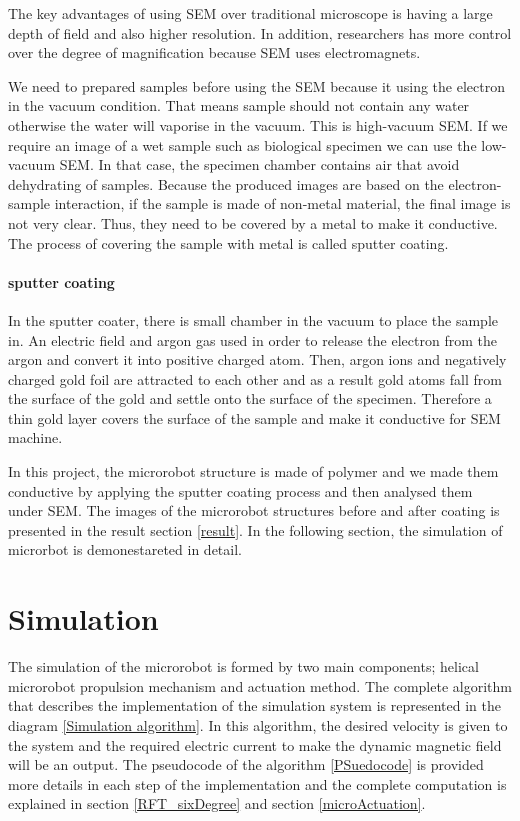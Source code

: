 \documentclass[12pt,a4paper,titlepage]{report}
\begin{document}
The key advantages of using \ac*{SEM} over traditional microscope is having a large depth of
 field and also higher resolution. In addition, researchers has more control over the degree of 
magnification because \ac*{SEM} uses electromagnets\citep{Doe:2014Jan:Online}.

We need to prepared samples before using the \ac{SEM} because it using the electron in the
 vacuum condition. That means sample should not contain any water otherwise the water will 
vaporise in the vacuum. This is high-vacuum \ac*{SEM}. If we require an image of a wet sample such 
as biological specimen we can use the low-vacuum \ac*{SEM}. In that case, the specimen chamber
 contains air that avoid dehydrating of samples.
Because the produced images are based on the electron-sample interaction, if the sample is made
 of non-metal material, the final image is not very clear. Thus, they need to be covered by a metal to
 make it conductive. The process of covering the sample with metal is called sputter coating\citep{Doe:2014Jan:Online}.

\paragraph{sputter coating}
In the sputter coater, there is small chamber in the vacuum to place the sample in. An electric field 
and argon gas used in order to release the electron from the argon and convert it into positive charged 
atom. Then, argon ions and negatively charged gold foil are attracted to each other and as a result gold 
atoms fall from the surface of the gold and settle onto the surface of the specimen. Therefore a thin gold 
layer covers the surface of the sample and make it conductive for \ac*{SEM} machine\citep{Doe:2014Jan:Online}.

In this project, the microrobot structure is made of polymer and we made them conductive by applying the 
sputter coating process and then analysed them under \ac*{SEM}. The images of the microrobot structures 
before and after coating is presented in the result section \ref{result}. In the following section, the simulation of 
microrbot is demonestareted in detail.



\section{Simulation}\label{simulation}
The simulation of the microrobot is formed by two main components; helical microrobot propulsion mechanism
 and actuation method. The complete algorithm that describes the implementation of the simulation
system is represented in the diagram \ref{Simulation algorithm}. In this algorithm, the desired velocity is given to the system
and the required electric current to make the dynamic magnetic field will be an output. The pseudocode of
the algorithm \ref{PSuedocode} is provided more details in each step of the implementation and the complete computation
is explained in section \ref{RFT_sixDegree} and section \ref{microActuation}.    
\end{document}
